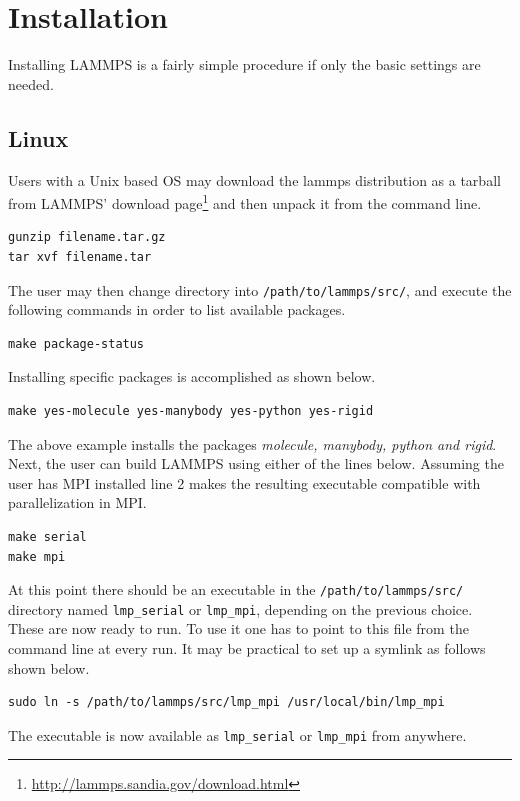 \documentclass[twoside,english]{uiofysmaster}
\begin{document}
\section{Installation}
Installing LAMMPS is a fairly simple procedure if only the basic settings are needed.

\subsection{Linux}
Users with a Unix based OS may download the lammps distribution as a tarball from LAMMPS' download page\footnote{\href{http://lammps.sandia.gov/download.html}{http://lammps.sandia.gov/download.html}} and then unpack it from the command line.
\begin{lstlisting}
gunzip filename.tar.gz
tar xvf filename.tar
\end{lstlisting}
The user may then change directory into \texttt{/path/to/lammps/src/}, and execute the following commands in order to list available packages. 
\begin{lstlisting}
make package-status
\end{lstlisting}
Installing specific packages is accomplished as shown below.
\begin{lstlisting}
make yes-molecule yes-manybody yes-python yes-rigid 
\end{lstlisting}
The above example installs the packages \textit{molecule, manybody, python and rigid}.
Next, the user can build LAMMPS using either of the lines below. Assuming the user has MPI installed line 2 makes the resulting executable compatible with parallelization in MPI.
\begin{lstlisting}
make serial
make mpi
\end{lstlisting}
At this point there should be an executable in the \texttt{/path/to/lammps/src/} directory named \texttt{lmp\_serial} or \texttt{lmp\_mpi}, depending on the previous choice. These are now ready to run.
To use it one has to point to this file from the command line at every run. It may be practical to set up a symlink as follows shown below.

\begin{lstlisting}
sudo ln -s /path/to/lammps/src/lmp_mpi /usr/local/bin/lmp_mpi
\end{lstlisting}
The executable is now available as \texttt{lmp\_serial} or \texttt{lmp\_mpi} from anywhere.
\end{document}
